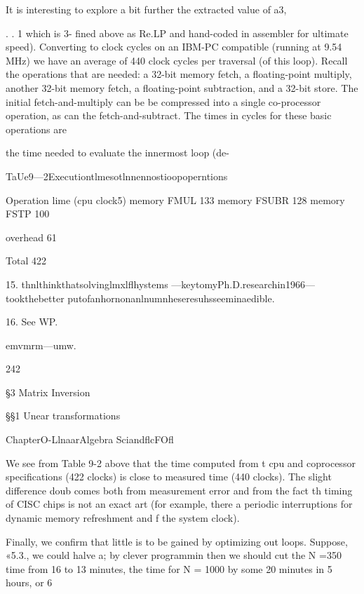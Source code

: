 {{{{{{{{{{{It is interesting to explore a bit further the extracted value of a3,

. . 1
which is 3-
ﬁned above as Re.LP and hand-coded in assembler for ultimate
speed). Converting to clock cycles on an IBM-PC compatible
(running at 9.54 MHz) we have an average of 440 clock cycles per
traversal (of this loop). Recall the operations that are needed: a
32-bit memory fetch, a ﬂoating-point multiply, another 32-bit
memory fetch, a ﬂoating-point subtraction, and a 32-bit store.
The initial fetch-and-multiply can be be compressed into a single
co-processor operation, as can the fetch-and-subtract. The times
in cycles for these basic operations are

the time needed to evaluate the innermost loop (de-

TaUe9—2Executiontlmesotlnnennostioopoperntions

 

Operation lime (cpu clock5)
memory FMUL 133
memory FSUBR 128
memory FSTP 100

overhead 61

 

Total 422

 

 

 

 

15. thnlthinkthatsolvinglmxlﬂhystems —keytomyPh.D.researchin1966— tookthebetter
putofanhornonanlnumnheseresuhsseeminaedible.

16. See WP.

emvmrm—umw.

242

§3 Matrix Inversion

§§1 Unear transformations

  
 
    
   
   
  

ChapterO-LlnaarAlgebra SciandﬂcFOﬂ

We see from Table 9-2 above that the time computed from t
cpu and coprocessor speciﬁcations (422 clocks) is close to
measured time (440 clocks). The slight difference doub
comes both from measurement error and from the fact th
timing of CISC chips is not an exact art (for example, there a
periodic interruptions for dynamic memory refreshment and f
the system clock).

Finally, we conﬁrm that little is to be gained by optimizing out
loops. Suppose, «5.3., we could halve a; by clever programmin
then we should cut the N =350 time from 16 to 13 minutes,
the time for N = 1000 by some 20 minutes in 5 hours, or 6%

}}}}}}}}}}}
